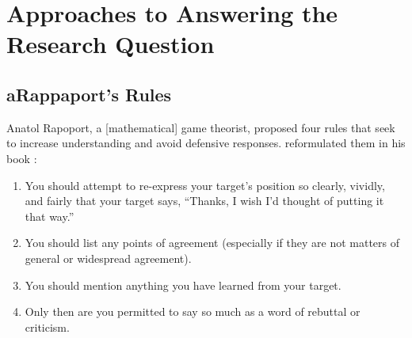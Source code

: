 \section{Approaches to Answering the Research Question}%
\label{sec:appr-answ-rese-quest}\indent%

\subsection{aRappaport's Rules}%
\label{sec:rappaports-rules}\indent%

Anatol Rapoport, a [mathematical] game theorist, proposed four rules that seek to increase understanding and avoid defensive responses.  reformulated them in his book  \parencite{Dennett2013}:
\begin{enumerate}[topsep=0.3\baselineskip,itemsep=0.25\baselineskip]
  \item You should attempt to re-express your target’s position so clearly, vividly, and fairly that your target says, “Thanks, I wish I’d thought of putting it that way.”
  \item You should list any points of agreement (especially if they are not matters of general or widespread agreement).
  \item You should mention anything you have learned from your target.
  \item Only then are you permitted to say so much as a word of rebuttal or criticism.
\end{enumerate}
\medskip

